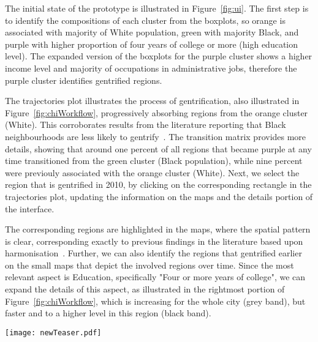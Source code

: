 The initial state of the prototype is illustrated in Figure~\ref{fig:ui}. The
first step is to identify the compositions of each cluster from the boxplots, so
orange is associated with majority of White population, green with majority
Black, and purple with higher proportion of four years of college or more (high
education level). The expanded version of the boxplots for the purple cluster
shows a higher income level and majority of occupations in administrative jobs,
therefore the purple cluster identifies gentrified regions.


The trajectories plot illustrates the process of gentrification, also
illustrated in Figure~\ref{fig:chiWorkflow}, progressively absorbing regions
from the orange cluster (White). This corroborates results from the literature
reporting that Black neighbourhoods are less likely to
gentrify~\citep{Hwang2014}. The transition matrix provides more details, showing
that around one percent of all regions that became purple at any time
transitioned from the green cluster (Black population), while nine percent were
previouly associated with the orange cluster (White). Next, we select the region
that is gentrified in 2010, by clicking on the corresponding rectangle in the
trajectories plot, updating the information on the maps and the details portion
of the interface.

The corresponding regions are highlighted in the maps, where the spatial pattern
is clear, corresponding exactly to previous findings in the literature based
upon harmonisation~\citep{Hwang2014}. Further, we can also identify the regions
that gentrified earlier on the small maps that depict the involved regions over
time. Since the most relevant aspect is Education, specifically "Four or more
years of college", we can expand the details of this aspect, as illustrated in
the rightmost portion of Figure~\ref{fig:chiWorkflow}, which is increasing for
the whole city (grey band), but faster and to a higher level in this region
(black band).



\begin{figure*}
    \centering
 \texttt{[image: newTeaser.pdf]}
 \caption{Workflow to discover gentrification in Chicago: the purple cluster
 corresponds to high education / income. Its population is increasing over time,
 absorbing from the majority White cluster (orange). By selecting the purple
 cluster in 2010, the region is highlighted in the maps. The proportion of
 people with 4+ years of college is increasing in the whole city (grey IQRs),
 but significantly more in this region (black).\label{fig:chiWorkflow}}
\end{figure*}



